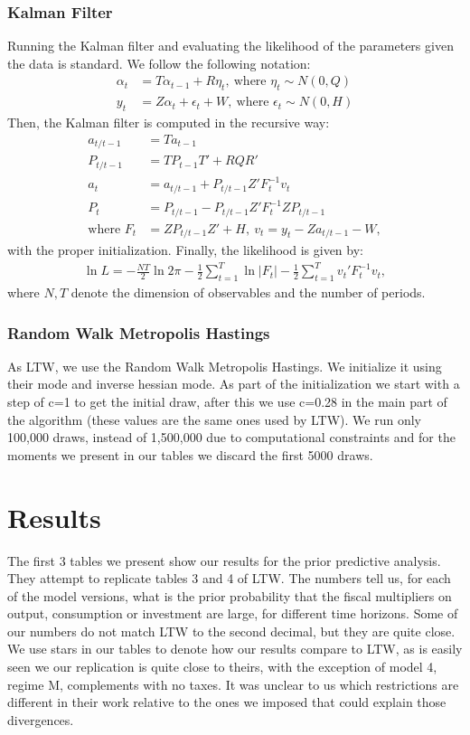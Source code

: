 \documentclass[letterpaper,12pt]{article}%
\begin{document}
\subsubsection*{Kalman Filter}
Running the Kalman filter and evaluating the likelihood of the parameters given the data is standard. We follow the following notation:
\begin{align*}
\alpha_t &= T \alpha_{t-1} + R \eta_t, \ \text{where } \eta_t \sim N(0,Q) \\
y_t &= Z \alpha_t + \epsilon_t + W, \ \text{where } \epsilon_t \sim N(0,H)
\end{align*}
Then, the Kalman filter is computed in the recursive way:
\begin{align*}
a_{t/t-1} &= T a_{t-1} \\
P_{t/t-1} &= T P_{t-1} T' + R Q R' \\
a_t &= a_{t/t-1} + P_{t/t-1} Z' F_t^{-1} v_t\\
P_t &= P_{t/t-1} - P_{t/t-1} Z' F_t^{-1} Z P_{t/t-1} \\
\text{where } F_t&= Z P_{t/t-1} Z' + H, \ v_t = y_t - Z a_{t/t-1} - W,
\end{align*}
with the proper initialization. Finally, the likelihood is given by:
\begin{align*}
\ln L = -\frac{NT}{2} \ln 2\pi - \frac{1}{2} \sum_{t=1}^{T} \ln |F_t| - \frac{1}{2} \sum_{t=1}^T v_t' F_t^{-1} v_t,
\end{align*}
where $N,T$ denote the dimension of observables and the number of periods.

\subsubsection*{Random Walk Metropolis Hastings}
As LTW, we use the Random Walk Metropolis Hastings. We initialize it using their mode and inverse hessian mode. As part of the initialization we start with a step of c=1 to get the initial draw, after this we use c=0.28 in the main part of the algorithm (these values are the same ones used by LTW). We run only 100,000 draws, instead of 1,500,000 due to computational constraints and for the moments we present in our tables we discard the first 5000 draws.

\section{Results}
The first 3 tables we present show our results for the prior predictive analysis. They attempt to replicate tables 3 and 4 of LTW. The numbers tell us, for each of the model versions, what is the prior probability that the fiscal multipliers on output, consumption or investment are large, for different time horizons. Some of our numbers do not match LTW to the second decimal, but they are quite close. We use stars in our tables to denote how our results compare to LTW, as is easily seen we our replication is quite close to theirs, with the exception of model 4, regime M, complements with no taxes. It was unclear to us which restrictions are different in their work relative to the ones we imposed that could explain those divergences.
\end{document}

